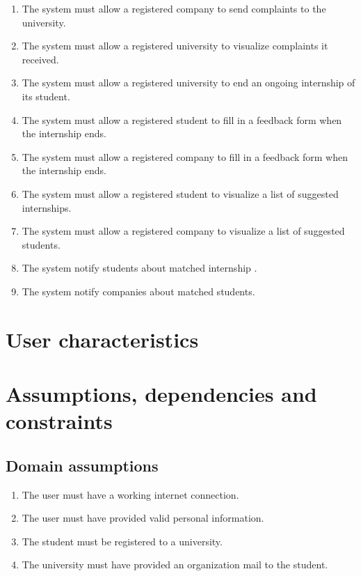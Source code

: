 \begin{enumerate}[label=\textbf{R\arabic* -}]
    \item The system must allow a registered company to send complaints to the university.
    \item The system must allow a registered university to visualize complaints it received.
    \item The system must allow a registered university to end an ongoing internship of its student.
    \item The system must allow a registered student to fill in a feedback form when the internship ends.
    \item The system must allow a registered company to fill in a feedback form when the internship ends.
    \item The system must allow a registered student to visualize a list of suggested internships.
    \item The system must allow a registered company to visualize a list of suggested students.
    \item The system notify students about matched internship .
    \item The system notify companies about matched students.
\end{enumerate}

\section{User characteristics}

\section{Assumptions, dependencies and constraints}

\subsection{Domain assumptions}

\begin{enumerate}[label=\textbf{D\arabic* -}]
    \item The user must have a working internet connection.
    \item The user must have provided valid personal information.
    \item The student must be registered to a university.
    \item The university must have provided an organization mail to the student.
\end{enumerate}
